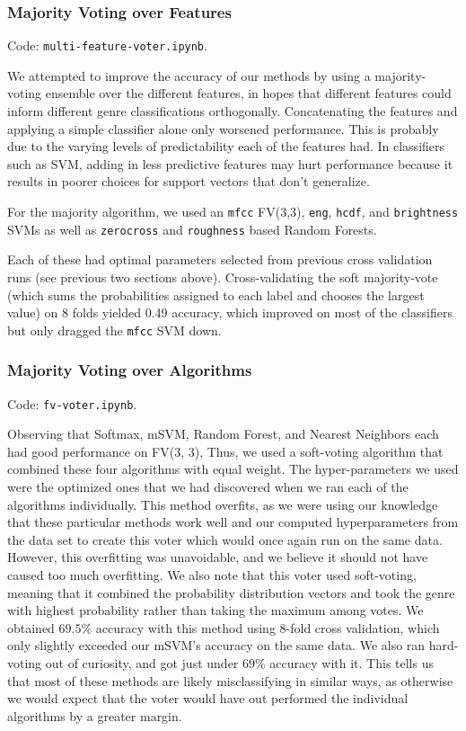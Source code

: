 \documentclass{article}
\begin{document}
\subsubsection{Majority Voting over Features}\label{majority-features}

Code: \texttt{multi-feature-voter.ipynb}. 

We attempted to improve the accuracy of our methods by using a majority-voting ensemble over the different features, in hopes that different features could inform different genre classifications orthogonally. Concatenating the features and applying a simple classifier alone only worsened performance. This is probably due to the varying levels of predictability each of the features had. In classifiers such as SVM, adding in less predictive features may hurt performance because it results in poorer choices for support vectors that don't generalize.

For the majority algorithm, we used an \texttt{mfcc} FV(3,3), \texttt{eng}, \texttt{hcdf}, and \texttt{brightness} SVMs as well as \texttt{zerocross} and \texttt{roughness} based Random Forests.

Each of these had optimal parameters selected from previous cross validation runs (see previous two sections above). Cross-validating the soft majority-vote (which sums the probabilities assigned to each label and chooses the largest value) on 8 folds yielded 0.49 accuracy, which improved on most of the classifiers but only dragged the \texttt{mfcc} SVM down. 

\subsubsection{Majority Voting over Algorithms}

Code: \texttt{fv-voter.ipynb}.

Observing that Softmax, mSVM, Random Forest, and Nearest Neighbors
each had good performance on FV(3, 3),
Thus, we used a soft-voting algorithm that combined these four
algorithms with equal weight.
The hyper-parameters we used were the optimized ones that we had
discovered when we ran each of the algorithms individually.
This method overfits,
as we were using our knowledge that these particular methods
work well and our computed hyperparameters from the data set
to create this voter which would once again run on the same data.
However, this overfitting was unavoidable, and we believe
it should not have caused too much overfitting.
We also note that this voter used soft-voting, meaning that
it combined the probability distribution vectors and took
the genre with highest probability rather than taking
the maximum among votes.
We obtained $69.5\%$ accuracy with this method using 8-fold cross validation, 
which only slightly exceeded our mSVM's accuracy on the same data.
We also ran hard-voting out of curiosity, and got just under $69\%$ accuracy with it.
This tells us that most of these methods are likely misclassifying 
in similar ways, as otherwise we would expect that the voter would
have out performed the individual algorithms by a greater margin.
\end{document}
